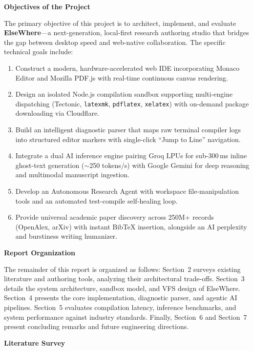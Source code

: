 \documentclass[12pt,a4paper,twoside]{article}
\newcommand{\numhead}[3]{%
  \begingroup\setlength{\parskip}{0pt}%
  \noindent\hspace*{0.25in}\makebox[0.25in][l]{\fontsize{18pt}{21.6pt}\selectfont\bfseries #1.}%
  {\fontsize{18pt}{21.6pt}\selectfont\bfseries #2}{\fontsize{18pt}{21.6pt}\selectfont #3}\par\nopagebreak
  \vspace{6pt}
  \endgroup}
\newcommand{\subhead}[2]{%
  \begingroup\setlength{\parskip}{0pt}\vspace{10pt}%
  \noindent\hspace*{0.25in}\makebox[0.35in][l]{\fontsize{13pt}{15.6pt}\selectfont\bfseries #1}%
  {\fontsize{13pt}{15.6pt}\selectfont\bfseries #2}\par\nopagebreak
  \vspace{4pt}
  \endgroup}
\newcommand{\code}[1]{\texttt{#1}}
\begin{document}
\subhead{1.3}{Objectives of the Project}
The primary objective of this project is to architect, implement, and evaluate \textbf{ElseWhere}---a next-generation, local-first research authoring studio that bridges the gap between desktop speed and web-native collaboration. The specific technical goals include:
\begin{enumerate}[leftmargin=0.5in,labelindent=0pt,labelwidth=0.25in,labelsep=0pt,
                  itemsep=2pt,parsep=0pt,topsep=2pt,partopsep=0pt,align=left]
    \item Construct a modern, hardware-accelerated web IDE incorporating Monaco Editor and Mozilla PDF.js with real-time continuous canvas rendering.
    \item Design an isolated Node.js compilation sandbox supporting multi-engine dispatching (Tectonic, \code{latexmk}, \code{pdflatex}, \code{xelatex}) with on-demand package downloading via Cloudflare.
    \item Build an intelligent diagnostic parser that maps raw terminal compiler logs into structured editor markers with single-click ``Jump to Line'' navigation.
    \item Integrate a dual AI inference engine pairing Groq LPUs for sub-300\,ms inline ghost-text generation ($\sim$250 tokens/s) with Google Gemini for deep reasoning and multimodal manuscript ingestion.
    \item Develop an Autonomous Research Agent with workspace file-manipulation tools and an automated test-compile self-healing loop.
    \item Provide universal academic paper discovery across 250M+ records (OpenAlex, arXiv) with instant Bib\TeX{} insertion, alongside an AI perplexity and burstiness writing humanizer.
\end{enumerate}

\subhead{1.4}{Report Organization}
The remainder of this report is organized as follows: Section~2 surveys existing literature and authoring tools, analyzing their architectural trade-offs. Section~3 details the system architecture, sandbox model, and VFS design of ElseWhere. Section~4 presents the core implementation, diagnostic parser, and agentic AI pipelines. Section~5 evaluates compilation latency, inference benchmarks, and system performance against industry standards. Finally, Section~6 and Section~7 present concluding remarks and future engineering directions.

\newpage
\numhead{2}{Literature Survey}{}
\end{document}
